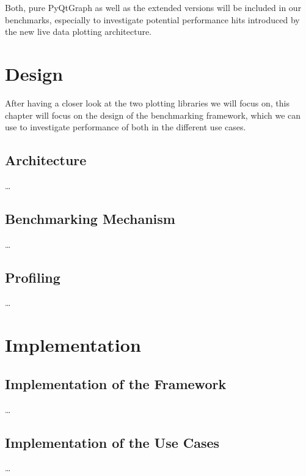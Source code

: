 Both, pure PyQtGraph as well as the extended versions will be included in our benchmarks, especially to investigate potential performance hits introduced by the new live data plotting architecture.




\section{Design}
\label{sec:application:design}

After having a closer look at the two plotting libraries we will focus on, this chapter will focus on the design of the benchmarking framework, which we can use to investigate performance of both in the different use cases.

\subsection{Architecture}
\dots

\subsection{Benchmarking Mechanism}
\dots

\subsection{Profiling}
\dots





\section{Implementation}
\label{sec:application:implementation}

\subsection{Implementation of the Framework}
\dots

\subsection{Implementation of the Use Cases}
\dots
